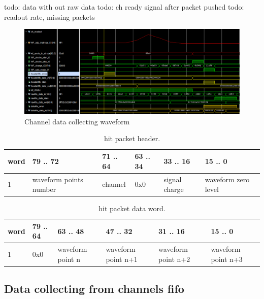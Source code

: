 \documentclass{article}
\begin{document}
todo: data with out raw data
todo: ch ready signal after packet pushed
todo: readout rate, missing packets

\begin{figure}[H]
	\centering 
	\includegraphics[width=1.0\textwidth]{ADC_ch_data_collector_wave.png}
	\caption{\label{fig:2} Channel data collecting waveform}
\end{figure}





\begin{table}[H]
\centering
\begin{tabular}{| l | l | l | l | l | l |}
\hline
word & 79 .. 72 & 71 .. 64 & 63 .. 34 & 33 .. 16 & 15 .. 0 \\ \hline
1 & waveform points number & channel & 0x0 & signal charge & waveform zero level \\ \hline
\end{tabular}
\caption{hit packet header.\label{tab1}}
\end{table}

\begin{table}[H]
\centering
\begin{tabular}{| l | l | l | l | l | l |}
\hline
word & 79 .. 64 & 63 .. 48 & 47 .. 32 & 31 .. 16 & 15 .. 0 \\ \hline
1 & 0x0 & waveform point n & waveform point n+1 & waveform point n+2 & waveform point n+3 \\ \hline
\end{tabular}
\caption{hit packet data word.\label{tab1}}
\end{table}








\subsection{Data collecting from channels fifo}
\end{document}

